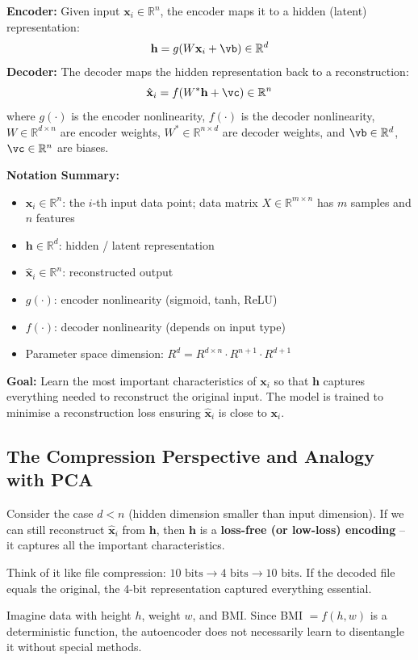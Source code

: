 \documentclass[12pt,a4paper]{article}
\newcommand{\R}{\mathbb{R}}
\newcommand{\vx}{\mathbf{x}}
\newcommand{\vh}{\mathbf{h}}
\newcommand{\hatx}{\hat{\mathbf{x}}}
\begin{document}
\begin{defbox}
\textbf{Encoder:} Given input $\vx_i \in \R^n$, the encoder maps it to a hidden (latent) representation:
\[
\vh = g(W\vx_i + \vb) \in \R^d
\]
\textbf{Decoder:} The decoder maps the hidden representation back to a reconstruction:
\[
\hatx_i = f(W^*\vh + \vc) \in \R^n
\]
where $g(\cdot)$ is the encoder nonlinearity, $f(\cdot)$ is the decoder nonlinearity, $W \in \R^{d\times n}$ are encoder weights, $W^* \in \R^{n\times d}$ are decoder weights, and $\vb \in \R^d$, $\vc \in \R^n$ are biases.
\end{defbox}

\textbf{Notation Summary:}
\begin{itemize}
  \item $\vx_i \in \R^n$: the $i$-th input data point; data matrix $X \in \R^{m\times n}$ has $m$ samples and $n$ features
  \item $\vh \in \R^d$: hidden / latent representation
  \item $\hatx_i \in \R^n$: reconstructed output
  \item $g(\cdot)$: encoder nonlinearity (sigmoid, tanh, ReLU)
  \item $f(\cdot)$: decoder nonlinearity (depends on input type)
  \item Parameter space dimension: $R^d = R^{d\times n} \cdot R^{n+1} \cdot R^{d+1}$
\end{itemize}

\begin{keybox}
\textbf{Goal:} Learn the most important characteristics of $\vx_i$ so that $\vh$ captures everything needed to reconstruct the original input. The model is trained to minimise a reconstruction loss ensuring $\hatx_i$ is close to $\vx_i$.
\end{keybox}

\subsection{The Compression Perspective and Analogy with PCA}

Consider the case $d < n$ (hidden dimension smaller than input dimension). If we can still reconstruct $\hatx_i$ from $\vh$, then $\vh$ is a \textbf{loss-free (or low-loss) encoding} -- it captures all the important characteristics.

\begin{exbox}
Think of it like file compression: $10\text{ bits} \to 4\text{ bits} \to 10\text{ bits}$. If the decoded file equals the original, the 4-bit representation captured everything essential.

\medskip
Imagine data with height $h$, weight $w$, and BMI. Since BMI $= f(h,w)$ is a deterministic function, the autoencoder does not necessarily learn to disentangle it without special methods.
\end{exbox}
\end{document}
